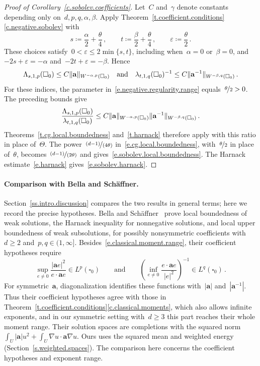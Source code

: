 \documentclass[11pt,letterpaper]{article}
\numberwithin{equation}{section}
\theoremstyle{definition}
\renewcommand{\a}{\mathbf{a}}
\newcommand{\eps}{\varepsilon}
\newcommand{\nf}{\nicefrac}
\newcommand{\qand}{\quad\mbox{and}\quad}
\newcommand{\cu}{\square}
\DeclarePairedDelimiter{\norm}{\lVert}{\rVert}
\begin{document}
\begin{proof}[Proof of Corollary~\ref{c.sobolev.coefficients}]
Let~$C$ and~$\gamma$ denote constants depending only on~$d,p,q,\alpha,\beta$. Apply Theorem~\ref{t.coefficient.conditions}\ref{c.negative.sobolev} with
\begin{equation*}
	s\coloneqq\frac\alpha2+\frac\theta4\,,\qquad t\coloneqq\frac\beta2+\frac\theta4\,,\qquad\eps\coloneqq\frac\theta2\,.
\end{equation*}
These choices satisfy~$0<\eps\leq2\min\{s,t\}$, including when~$\alpha=0$ or~$\beta=0$, and~$-2s+\eps=-\alpha$ and~$-2t+\eps=-\beta$. Hence
\begin{equation*}
	\Lambda_{s,1,p}(\cu_0)\leq C\norm{\a}_{W^{-\alpha,p}(\cu_0)}\qand\lambda_{t,1,q}(\cu_0)^{-1}\leq C\norm{\a^{-1}}_{W^{-\beta,q}(\cu_0)}\,.
\end{equation*}
For these indices, the parameter in~\eqref{e.negative.regularity.range} equals~$\nf\theta2>0$. The preceding bounds give
\begin{equation*}
	\frac{\Lambda_{s,1,p}(\cu_0)}{\lambda_{t,1,q}(\cu_0)}\leq C\norm{\a}_{W^{-\alpha,p}(\cu_0)}\norm{\a^{-1}}_{W^{-\beta,q}(\cu_0)}\,.
\end{equation*}
Theorems~\ref{t.cg.local.boundedness} and~\ref{t.harnack} therefore apply with this ratio in place of~$\Theta$. The power~$\nf{(d-1)}{(4\theta)}$ in~\eqref{e.cg.local.boundedness}, with~$\nf\theta2$ in place of~$\theta$, becomes~$\nf{(d-1)}{(2\theta)}$ and gives~\eqref{e.sobolev.local.boundedness}. The Harnack estimate~\eqref{e.harnack} gives~\eqref{e.sobolev.harnack}.
\end{proof}

\paragraph{Comparison with Bella and Sch\"affner.} Section~\ref{ss.intro.discussion} compares the two results in general terms; here we record the precise hypotheses. Bella and Sch\"affner~\cite[Theorems~1--2]{Bella.Schaffner.regularity} prove local boundedness of weak solutions, the Harnack inequality for nonnegative solutions, and local upper boundedness of weak subsolutions, for possibly nonsymmetric coefficients with~$d\geq2$ and~$p,q\in(1,\infty]$. Besides~\eqref{e.classical.moment.range}, their coefficient hypotheses require
\begin{equation*}
	\sup_{e\neq0}\frac{|\a e|^2}{e\cdot\a e}\in L^p(\cu_0)\qquad\mbox{and}\qquad\left(\inf_{e\neq0}\frac{e\cdot\a e}{|e|^2}\right)^{-1}\in L^q(\cu_0)\,.
\end{equation*}
For symmetric~$\a$, diagonalization identifies these functions with~$|\a|$ and~$|\a^{-1}|$. Thus their coefficient hypotheses agree with those in Theorem~\ref{t.coefficient.conditions}\ref{c.classical.moments}, which also allows infinite exponents, and in our symmetric setting with~$d\geq3$ this part reaches their whole moment range. Their solution spaces are completions with the squared norm~$\int_U|\a|u^2+\int_U\nabla u\cdot\a\nabla u$. Ours uses the squared mean and weighted energy (Section~\ref{s.weighted.spaces}). The comparison here concerns the coefficient hypotheses and exponent range.
\end{document}
